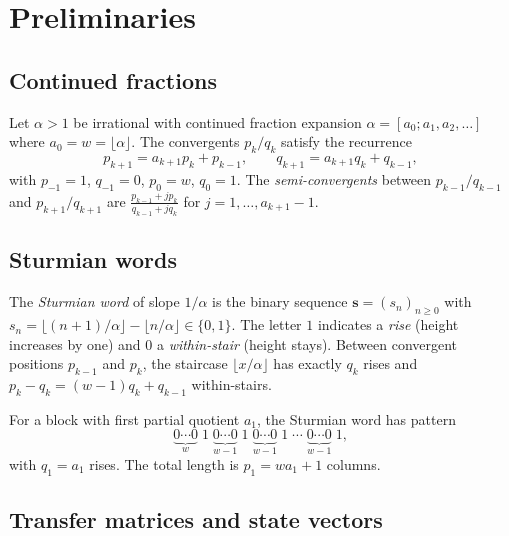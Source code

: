 \documentclass[11pt]{article}
\theoremstyle{definition}
\theoremstyle{remark}
\newcommand{\floor}[1]{\lfloor #1 \rfloor}
\begin{document}
\section{Preliminaries}\label{sec:prelim}

\subsection{Continued fractions}

Let $\alpha > 1$ be irrational with continued fraction expansion
$\alpha = [a_0; a_1, a_2, \ldots]$ where $a_0 = w = \floor{\alpha}$.
The convergents $p_k/q_k$ satisfy the recurrence
\begin{equation}\label{eq:cf-recurrence}
  p_{k+1} = a_{k+1} p_k + p_{k-1}, \qquad
  q_{k+1} = a_{k+1} q_k + q_{k-1},
\end{equation}
with $p_{-1} = 1$, $q_{-1} = 0$, $p_0 = w$, $q_0 = 1$.
The \emph{semi-convergents} between $p_{k-1}/q_{k-1}$ and
$p_{k+1}/q_{k+1}$ are
$\frac{p_{k-1} + j p_k}{q_{k-1} + j q_k}$ for
$j = 1, \ldots, a_{k+1} - 1$.

\subsection{Sturmian words}\label{ssec:sturmian}

The \emph{Sturmian word} of slope $1/\alpha$ is the binary sequence
$\mathbf{s} = (s_n)_{n \geq 0}$ with
$s_n = \floor{(n+1)/\alpha} - \floor{n/\alpha} \in \{0, 1\}$.
The letter $1$ indicates a \emph{rise} (height increases by one) and
$0$ a \emph{within-stair} (height stays).
Between convergent positions $p_{k-1}$ and $p_k$, the staircase
$\floor{x/\alpha}$ has exactly $q_k$ rises and
$p_k - q_k = (w-1)q_k + q_{k-1}$ within-stairs.

For a block with first partial quotient $a_1$, the Sturmian word
has pattern
\begin{equation}\label{eq:sturmian-pattern}
  \underbrace{0 \cdots 0}_{w}\; 1 \;
  \underbrace{0 \cdots 0}_{w-1}\; 1 \;
  \underbrace{0 \cdots 0}_{w-1}\; 1 \;
  \cdots \;
  \underbrace{0 \cdots 0}_{w-1}\; 1,
\end{equation}
with $q_1 = a_1$ rises.
The total length is $p_1 = wa_1 + 1$ columns.

\subsection{Transfer matrices and state vectors}
\end{document}
